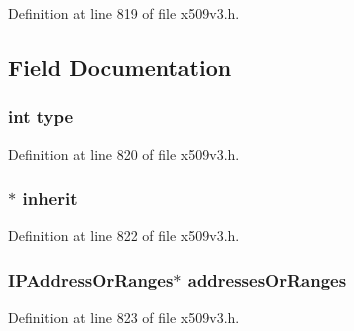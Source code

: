 Definition at line 819 of file x509v3.\+h.



\subsection{Field Documentation}
\subsubsection[{\texorpdfstring{type}{type}}]{\setlength{\rightskip}{0pt plus 5cm}int type}\hypertarget{struct_i_p_address_choice__st_ac765329451135abec74c45e1897abf26}{}\label{struct_i_p_address_choice__st_ac765329451135abec74c45e1897abf26}


Definition at line 820 of file x509v3.\+h.

\subsubsection[{\texorpdfstring{inherit}{inherit}}]{$\ast$ inherit}\hypertarget{struct_i_p_address_choice__st_aec983f5c76248f78211a9212bdd26548}{}\label{struct_i_p_address_choice__st_aec983f5c76248f78211a9212bdd26548}


Definition at line 822 of file x509v3.\+h.

\subsubsection[{\texorpdfstring{addresses\+Or\+Ranges}{addressesOrRanges}}]{\setlength{\rightskip}{0pt plus 5cm}I\+P\+Address\+Or\+Ranges$\ast$ addresses\+Or\+Ranges}\hypertarget{struct_i_p_address_choice__st_a22596ca1540f8b724214775d9308d5a4}{}\label{struct_i_p_address_choice__st_a22596ca1540f8b724214775d9308d5a4}


Definition at line 823 of file x509v3.\+h.

